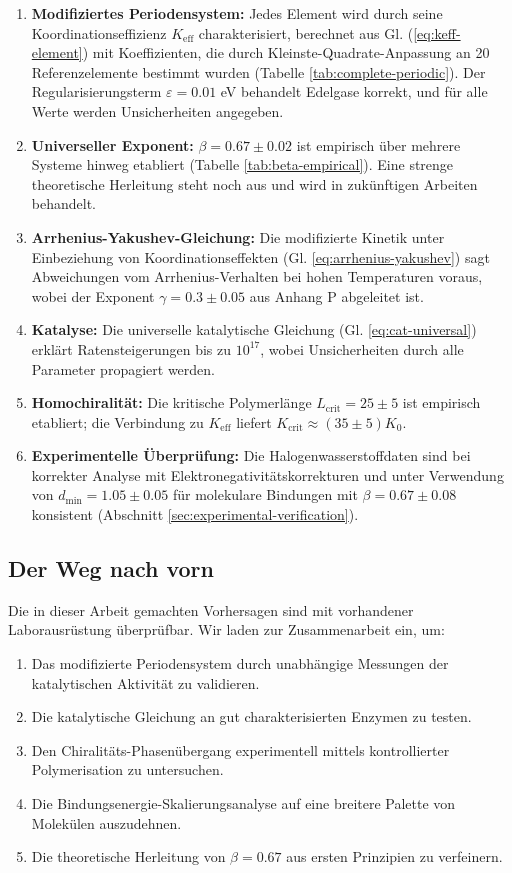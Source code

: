 \documentclass[12pt,a4paper]{article}
\newcommand{\Keff}{K_{\mathrm{eff}}}
\newcommand{\Kcrit}{K_{\mathrm{crit}}}
\begin{document}
	\begin{enumerate}
		\item \textbf{Modifiziertes Periodensystem:} Jedes Element wird durch seine Koordinationseffizienz $\Keff$ charakterisiert, berechnet aus Gl. (\ref{eq:keff-element}) mit Koeffizienten, die durch Kleinste-Quadrate-Anpassung an 20 Referenzelemente bestimmt wurden (Tabelle \ref{tab:complete-periodic}). Der Regularisierungsterm $\varepsilon = 0.01$ eV behandelt Edelgase korrekt, und für alle Werte werden Unsicherheiten angegeben.
		\item \textbf{Universeller Exponent:} $\beta = 0.67 \pm 0.02$ ist empirisch über mehrere Systeme hinweg etabliert (Tabelle \ref{tab:beta-empirical}). Eine strenge theoretische Herleitung steht noch aus und wird in zukünftigen Arbeiten behandelt.
		\item \textbf{Arrhenius-Yakushev-Gleichung:} Die modifizierte Kinetik unter Einbeziehung von Koordinationseffekten (Gl. \ref{eq:arrhenius-yakushev}) sagt Abweichungen vom Arrhenius-Verhalten bei hohen Temperaturen voraus, wobei der Exponent $\gamma = 0.3 \pm 0.05$ aus Anhang P abgeleitet ist.
		\item \textbf{Katalyse:} Die universelle katalytische Gleichung (Gl. \ref{eq:cat-universal}) erklärt Ratensteigerungen bis zu $10^{17}$, wobei Unsicherheiten durch alle Parameter propagiert werden.
		\item \textbf{Homochiralität:} Die kritische Polymerlänge $L_{\text{crit}} = 25 \pm 5$ ist empirisch etabliert; die Verbindung zu $\Keff$ liefert $\Kcrit \approx (35 \pm 5) K_0$.
		\item \textbf{Experimentelle Überprüfung:} Die Halogenwasserstoffdaten sind bei korrekter Analyse mit Elektronegativitätskorrekturen und unter Verwendung von $d_{\text{min}} = 1.05 \pm 0.05$ für molekulare Bindungen mit $\beta = 0.67 \pm 0.08$ konsistent (Abschnitt \ref{sec:experimental-verification}).
	\end{enumerate}
	
	\subsection{Der Weg nach vorn}
	
	Die in dieser Arbeit gemachten Vorhersagen sind mit vorhandener Laborausrüstung überprüfbar. Wir laden zur Zusammenarbeit ein, um:
	\begin{enumerate}
		\item Das modifizierte Periodensystem durch unabhängige Messungen der katalytischen Aktivität zu validieren.
		\item Die katalytische Gleichung an gut charakterisierten Enzymen zu testen.
		\item Den Chiralitäts-Phasenübergang experimentell mittels kontrollierter Polymerisation zu untersuchen.
		\item Die Bindungsenergie-Skalierungsanalyse auf eine breitere Palette von Molekülen auszudehnen.
		\item Die theoretische Herleitung von $\beta = 0.67$ aus ersten Prinzipien zu verfeinern.
	\end{enumerate}
	
\end{document}
